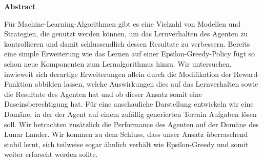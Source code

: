 %
%
\vspace*{2cm}

\begin{center}
    \textbf{Abstract}
\end{center}

\vspace*{1cm}


\noindent Für Machine-Learning-Algorithmen gibt es eine Vielzahl von Modellen und Strategien, die genutzt werden können, um das Lernverhalten des Agenten zu kontrollieren und damit schlussendlich dessen Resultate zu verbessern. Bereits eine simple Erweiterung wie das Lernen auf einer Epsilon-Greedy-Policy fügt so schon neue Komponenten zum Lernalgorithmus hinzu. Wir untersuchen, inwieweit sich derartige Erweiterungen allein durch die Modifikation der Reward-Funktion abbilden lassen, welche Auswirkungen dies auf das Lernverhalten sowie die Resultate des Agenten hat und ob dieser Ansatz somit eine Daseinsberechtigung hat. Für eine anschauliche Darstellung entwickeln wir eine Domäne, in der der Agent auf einem zufällig generierten Terrain Aufgaben lösen soll. Wir betrachten zusätzlich die Performance des Agenten auf der Domäne des Lunar Lander. Wir kommen zu dem Schluss, dass unser Ansatz überraschend stabil lernt, sich teilweise sogar ähnlich verhält wie Epsilon-Greedy und somit weiter erforscht werden sollte.

